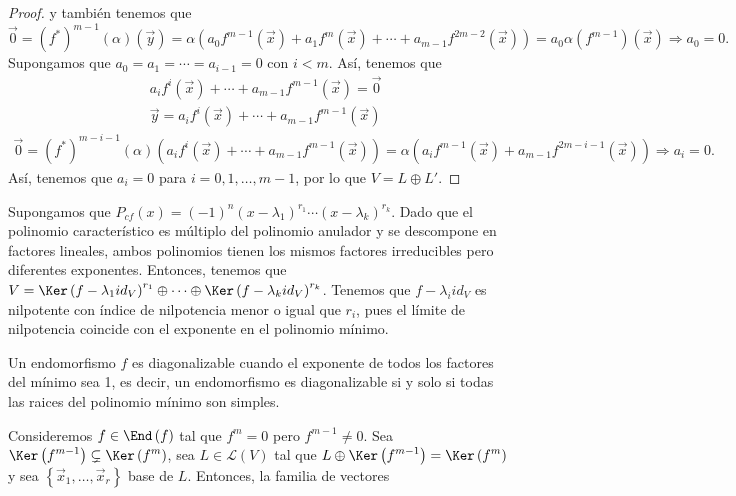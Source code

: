 \begin{proof}
y también tenemos que
\[ \vec{0} = \left(f^{*}\right)^{m -1}\left(\alpha \right)\left(\vec{y}\right) = \alpha \left(a_{0}f^{m -1}\left(\vec{x}\right) + a_{1}f^{m}\left(\vec{x}\right) + \cdots + a_{m -1}f^{2m-2}\left(\vec{x}\right)\right) = a_{0}\alpha\left(f^{m -1}\right)\left(\vec{x}\right) \Rightarrow a_{0} = 0.\]
Supongamos que $\displaystyle a_{0}= a_{1} = \cdots = a_{i-1} = 0 $ con $\displaystyle i < m $. Así, tenemos que
\[
\begin{split}
 & a_{i}f^{i}\left(\vec{x}\right) + \cdots + a_{m -1}f^{m -1}\left(\vec{x}\right) = \vec{0} \\
& \vec{y} = a_{i}f^{i}\left(\vec{x}\right) + \cdots + a_{m -1}f^{m -1}\left(\vec{x}\right) 
\end{split}
\]
\[
\begin{split}
	\vec{0} = \left(f^{*}\right)^{m -i-1}\left(\alpha \right)\left(a_{i}f^{i}\left(\vec{x}\right) + \cdots + a_{m -1}f^{m -1}\left(\vec{x}\right)\right) = \alpha\left(a_{i}f^{m -1}\left(\vec{x}\right)+a_{m -1}f^{2m -i-1}\left(\vec{x}\right)\right) \Rightarrow a_{i} = 0.
\end{split}
\]
Así, tenemos que $\displaystyle a_{i} = 0 $ para $\displaystyle i = 0, 1, \ldots, m -1 $, por lo que $\displaystyle V = L \oplus L'$.
\end{proof}
\begin{observation}
\normalfont Supongamos que $\displaystyle P_{cf}\left(x\right) = \left(-1\right)^{n}\left(x -\lambda_{1}\right)^{r_{1}} \cdots \left(x - \lambda_{k}\right)^{r_{k}} $. Dado que el polinomio característico es múltiplo del polinomio anulador y se descompone en factores lineales, ambos polinomios tienen los mismos factores irreducibles pero diferentes exponentes. 
Entonces, tenemos que $\displaystyle V = \Ker\left(f -\lambda_{1}id _{V}\right)^{r_{1}} \oplus \cdots \oplus \Ker\left(f - \lambda_{k}id _{V}\right)^{r_{k}} $. Tenemos que $\displaystyle f -\lambda_{i}id _{V} $ es nilpotente con índice de nilpotencia menor o igual que $\displaystyle r_{i} $, pues el límite de nilpotencia coincide con el exponente en el polinomio mínimo.
\end{observation}
\begin{observation}
\normalfont Un endomorfismo $\displaystyle f $ es diagonalizable cuando el exponente de todos los factores del mínimo sea 1, es decir, un endomorfismo es diagonalizable si y solo si todas las raices del polinomio mínimo son simples.
\end{observation}
Consideremos $\displaystyle f \in \End\left(f\right) $ tal que $\displaystyle f^{m} = 0 $ pero $\displaystyle f^{ m -1}\neq 0 $. Sea $\displaystyle \Ker\left(f^{m -1}\right)\subsetneq \Ker\left(f^{m}\right) $, sea $\displaystyle L \in \mathcal{L}\left(V\right) $ tal que $\displaystyle L \oplus \Ker\left(f^{m -1}\right) = \Ker\left(f^{m}\right) $ y sea $\displaystyle \left\{ \vec{x}_{1}, \ldots, \vec{x}_{r}\right\}  $ base de $\displaystyle L $. Entonces, la familia de vectores
